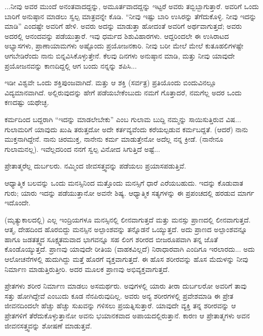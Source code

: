 ...ನೀವು ಅವರ ಮುಂದೆ ಅನಂತವಾದದ್ದನ್ನು, ಅಮೂರ್ತವಾದದ್ದನ್ನು ಇಟ್ಟರೆ ಅವರು ತಬ್ಬಿಬ್ಬಾಗುತ್ತಾರೆ. ಅವರಿಗೆ ಒಂದು ಬಾರಿಗೆ ಅನುಷ್ಠಾನ ಮಾಡಲು ಸ್ವಲ್ಪ ಮಾತ್ರವನ್ನೇ ಕೊಡಿ. “ನೀವು ಇಷ್ಟು ಬಾರಿ ಉಸಿರನ್ನು ತೆಗೆದುಕೊಳ್ಳಿ. ನೀವು ಇದನ್ನು ಮಾಡಿ'' ಎಂದಷ್ಟೇ ಅವರಿಗೆ ಹೇಳಿ. ಅವರು ಅದನ್ನು ಮಾಡುತ್ತಾ ಹೋದಂತೆ ಅವರಿಗೆ ಅರ್ಥವಾಗುತ್ತದೆ; ಅವರು ಅದರಲ್ಲಿ ಆನಂದವನ್ನು ಪಡೆಯುತ್ತಾರೆ. ಇವು ಧರ್ಮದ ಶಿಶುವಿಹಾರಗಳು. ಆದ್ದರಿಂದಲೇ ಈ ಉಸಿರಾಟದ ಅಭ್ಯಾಸಗಳು, ಪ್ರಾಣಾಯಾಮಗಳು ಅಷ್ಟೊಂದು ಪ್ರಯೋಜನಕಾರಿ. ನೀವು ಬರೀ ಮೇಲೆ ಮೇಲೆ ಕುತೂಹಲಿಗಳಷ್ಟೇ ಆಗಬೇಡಿರೆಂದು ನಾನು ಬಿನ್ನವಿಸಿಕೊಳ್ಳುತ್ತೇನೆ. ಕೆಲವು ದಿನಗಳು ಅನುಷ್ಠಾನ ಮಾಡಿ, ಮತ್ತು ನೀವು ಯಾವುದೇ ಪ್ರಯೋಜನವನ್ನು ಕಾಣದಿದ್ದಲ್ಲಿ ಆಗ ಬಂದು ನನ್ನನ್ನು ಶಪಿಸಿ...

\vskip 1.5pt

ಇಡೀ ವಿಶ್ವವೇ ಒಂದು ಶಕ್ತಿಪುಂಜವಾಗಿದೆ. ಮತ್ತು ಆ ಶಕ್ತಿ (ಸರ್ವತ್ರ) ಪ್ರತಿಯೊಂದು ಬಿಂದುವಿನಲ್ಲೂ ವಿದ್ಯಮಾನವಾಗಿದೆ. ಅಲ್ಲಿರುವುದನ್ನು ಹೇಗೆ ಪಡೆಯಬೇಕೆಂಬುದು ನಮಗೆ ಗೊತ್ತಾದರೆ, ನಮಗೆಲ್ಲ ಅದರ ಒಂದು ಕಣದಷ್ಟು ಯಥೇಚ್ಛ.

\vskip 1.5pt

ಕರ್ಮದಿಂದ ಬದ್ದರಾಗಿ “ಇದನ್ನು ಮಾಡಲೇಬೇಕು” ಎಂಬ ಗುಲಾಮ ಬುದ್ದಿ ನಮ್ಮನ್ನು ಸಾಯಿಸುತ್ತಿರುವ ವಿಷ... ಗುಲಾಮರಿಗೆ ಯಾವುದು ಖುಷಿ ತರುತ್ತದೋ ಅದೇ ಕರ್ತವ್ಯವೆಂದು ಕರೆಯಲ್ಪಡುವ ಕರ್ಮಬದ್ದತೆ. (ಆದರೆ) ನಾನು ಮುಕ್ತನಾಗಿದ್ದೇನೆ. ನಾನು ಚಿರಮುಕ್ತ, ನಾನೇನು ಕರ್ಮ ಮಾಡುತ್ತೇನೋ ಅದೆಲ್ಲ ನನ್ನ ಕ್ರೀಡೆ. (ನಾನೇನೂ ಗುಲಾಮನಲ್ಲ). ಇವೆಲ್ಲದರಿಂದ ನನಗೆ ಸ್ವಲ್ಪ ವಿನೋದ ಸಿಗುತ್ತಿದೆ ಅಷ್ಟೆ...

\vskip 1.5pt

ಪ್ರೇತಾತ್ಮರೆಲ್ಲ ದುರ್ಬಲರು. ನಮ್ಮಿಂದ ಜೀವಸತ್ತ್ವವನ್ನು ಪಡೆಯಲು ಪ್ರಯಾಸಪಡುತ್ತಿವೆ.

\vskip 1.5pt

ಆಧ್ಯಾತ್ಮಿಕ ಬಲವನ್ನು ಒಂದು ಮನಸ್ಸಿನಿಂದ ಮತ್ತೊಂದು ಮನಸ್ಸಿಗೆ ಧಾರೆ ಎರೆಯಬಹುದು. ಇದನ್ನು ಕೊಡುವಾತ ಗುರು; ಯಾರು ಇದನ್ನು ಪಡೆಯುತ್ತಾನೋ ಅವನೇ ಶಿಷ್ಯ. ಆಧ್ಯಾತ್ಮಿಕ ಸತ್ಯಗಳನ್ನು ಈ ಪ್ರಪಂಚದಲ್ಲಿ ಹರಡುವ ಮಾರ್ಗ ಇದೊಂದೇ.

\vskip 1.5pt

(ಮೃತ್ಯುಕಾಲದಲ್ಲಿ) ಎಲ್ಲ ಇಂದ್ರಿಯಗಳೂ ಮನಸ್ಸಿನಲ್ಲಿ ಲೀನವಾಗುತ್ತದೆ ಮತ್ತು ಮನಸ್ಸು ಪ್ರಾಣದಲ್ಲಿ ಲೀನವಾಗುತ್ತದೆ. ಆತ್ಮ, ದೇಹದಿಂದ ಹೊರಬಿದ್ದು ಮನಸ್ಸಿನ ಅಲ್ಪಾಂಶವನ್ನು ತನ್ನೊಡನೆ ಒಯ್ಯುತ್ತದೆ. ಅದು ಪ್ರಾಣದ ಅಲ್ಪಾಂಶವನ್ನೂ ಹಾಗೂ ಜಡತತ್ತ್ವದ ಸೂಕ್ಷ್ಮತಮವಾದ ಭಾಗವನ್ನೂ ಸಹ ಲಿಂಗ ಶರೀರದ ಬೀಜರೂಪವಾಗಿ ತನ್ನ ಜೊತೆ ಕೊಂಡೊಯ್ಯುತ್ತದೆ. ಪ್ರಾಣವು ಯಾವುದೇ ರೀತಿಯ (ವಾಹಕವಿಲ್ಲದೆ) ನಿರಾಧಾರವಾಗಿ ಎಂದಿಗೂ ಇರಲಾರದು... ಅದು ಆಲೋಚನೆಗಳಲ್ಲಿ ಹುದುಗಿದ್ದು ಮತ್ತೆ ಹೊರಗೆ ವ್ಯಕ್ತವಾಗುತ್ತದೆ. ಈ ಹೊಸ ಶರೀರವನ್ನು ಹೊಸ ಮೆದುಳನ್ನು ನೀವು ನಿರ್ಮಾಣ ಮಾಡುತ್ತಿರುತ್ತೀರಿ. ಅದರ ಮೂಲಕ ಪ್ರಾಣವು ಅಭಿವ್ಯಕ್ತವಾಗುತ್ತದೆ.

\vskip 1.5pt

ಪ್ರೇತಗಳು ಶರೀರ ನಿರ್ಮಾಣ ಮಾಡಲು ಅಸಮರ್ಥರು. ಅವುಗಳಲ್ಲಿ ಯಾರು ತೀರಾ ದುರ್ಬಲರೋ ಅವರಿಗೆ ತಾವು ಸತ್ತು ಹೋಗಿದ್ದೇವೆ ಎಂಬುದು ಕೂಡ ನೆನಪಿರುವುದಿಲ್ಲ. ಅವರು ಅನ್ಯ ಶರೀರಗಳಲ್ಲಿ ಪ್ರವೇಶಮಾಡಿ ಈ ಪ್ರೇತ ಜೀವನದಿಂದಲೇ ಹೆಚ್ಚು ಹೆಚ್ಚು ಸುಖವನ್ನು ಗಳಿಸಲು ಪ್ರಯತ್ನಿಸುತ್ತಾರೆ. ಯಾವುದೇ ವ್ಯಕ್ತಿ ತನ್ನ ಶರೀರವನ್ನು ಆ ಪ್ರೇತಗಳಿಗೆ ತೆರೆದುಕೊಳ್ಳುತ್ತಾನೋ ಅವನು ಭಯಾನಕವಾದ ಅಪಾಯದಲ್ಲಿರುತ್ತಾನೆ. ಕಾರಣ ಆ ಪ್ರೇತಾತ್ಮಗಳು ಅವನ ಜೀವನಸತ್ತ್ವವನ್ನು ಶೋಷಣೆ ಮಾಡುತ್ತವೆ.

